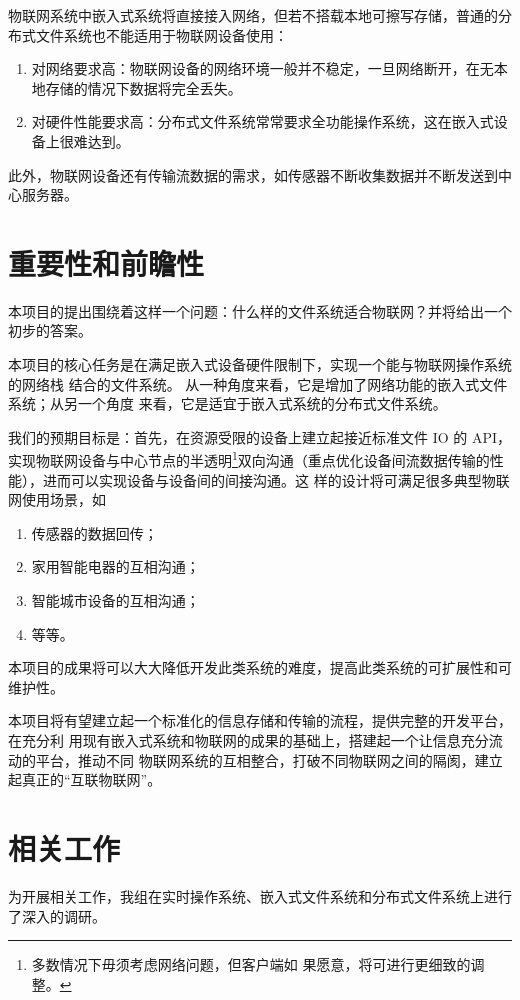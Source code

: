 \documentclass{ctexart}
\begin{document}
物联网系统中嵌入式系统将直接接入网络，但若不搭载本地可擦写存储，普通的分布式文件系统也不能适用于物联网设备使用：
\begin{enumerate}
	\item 对网络要求高：物联网设备的网络环境一般并不稳定，一旦网络断开，在无本地存储的情况下数据将完全丢失。
	\item 对硬件性能要求高：分布式文件系统常常要求全功能操作系统，这在嵌入式设备上很难达到。
\end{enumerate}

此外，物联网设备还有传输流数据的需求，如传感器不断收集数据并不断发送到中心服务器。

\section{重要性和前瞻性}

本项目的提出围绕着这样一个问题：什么样的文件系统适合物联网？并将给出一个初步的答案。

本项目的核心任务是在满足嵌入式设备硬件限制下，实现一个能与物联网操作系统的网络栈
结合的文件系统。 从一种角度来看，它是增加了网络功能的嵌入式文件系统；从另一个角度
来看，它是适宜于嵌入式系统的分布式文件系统。

我们的预期目标是：首先，在资源受限的设备上建立起接近标准文件 IO 的 API，
实现物联网设备与中心节点的半透明\footnote{多数情况下毋须考虑网络问题，但客户端如
  果愿意，将可进行更细致的调整。}双向沟通（重点优化设备间流数据传输的性能），进而可以实现设备与设备间的间接沟通。这
样的设计将可满足很多典型物联网使用场景，如
\begin{enumerate}
\item 传感器的数据回传；
\item 家用智能电器的互相沟通；
\item 智能城市设备的互相沟通；
\item 等等。
\end{enumerate}
本项目的成果将可以大大降低开发此类系统的难度，提高此类系统的可扩展性和可维护性。

本项目将有望建立起一个标准化的信息存储和传输的流程，提供完整的开发平台，在充分利
用现有嵌入式系统和物联网的成果的基础上，搭建起一个让信息充分流动的平台，推动不同
物联网系统的互相整合，打破不同物联网之间的隔阂，建立起真正的“互联物联网”。

\section{相关工作}

为开展相关工作，我组在实时操作系统、嵌入式文件系统和分布式文件系统上进行了深入的调研。
\end{document}
